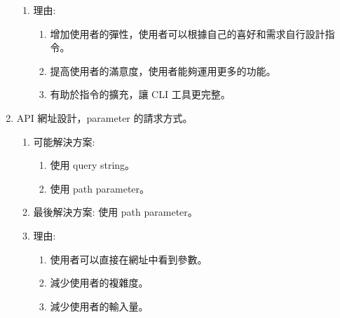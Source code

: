 \documentclass{report}
\begin{document}
\begin{enumerate}
\begin{enumerate}
					\item 理由:
						\begin{enumerate}
							\item 增加使用者的彈性，使用者可以根據自己的喜好和需求自行設計指令。
							\item 提高使用者的滿意度，使用者能夠運用更多的功能。
							\item 有助於指令的擴充，讓 CLI 工具更完整。
						\end{enumerate}
				\end{enumerate}
			\item API 網址設計，parameter 的請求方式。
				\begin{enumerate}
					\item 可能解決方案:
						\begin{enumerate}
							\item 使用 query string。
							\item 使用 path parameter。
						\end{enumerate}
					\item 最後解決方案: 使用 path parameter。
					\item 理由:
						\begin{enumerate}
							\item 使用者可以直接在網址中看到參數。
							\item 減少使用者的複雜度。
							\item 減少使用者的輸入量。
						\end{enumerate}
				\end{enumerate}
\end{enumerate}
\end{document}
